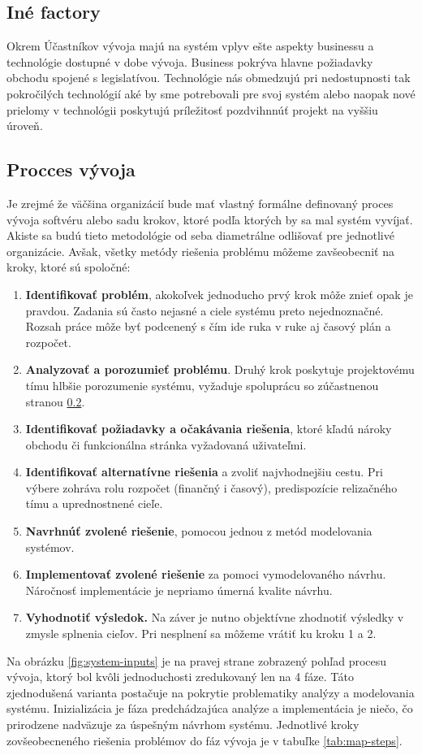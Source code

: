 \subsection{Iné factory}
Okrem Účastníkov vývoja majú na systém vplyv ešte aspekty businessu a technológie dostupné v dobe vývoja. Business pokrýva hlavne požiadavky obchodu spojené s legislatívou. Technológie nás obmedzujú pri nedostupnosti tak pokročilých technológií aké by sme potrebovali pre svoj systém alebo naopak nové prielomy v technológii poskytujú príležitosť pozdvihnnúť projekt na vyššiu úroveň.

\subsection{Procces vývoja}

Je zrejmé že väčšina organizácií bude mať vlastný formálne definovaný proces vývoja softvéru alebo sadu krokov, ktoré podľa ktorých by sa mal systém vyvíjať. Akiste sa budú tieto metodológie od seba diametrálne odlišovať pre jednotlivé organizácie. Avšak, všetky metódy riešenia problému môžeme zavšeobecniť na kroky, ktoré sú spoločné: \\

\begin{enumerate}
	\item \textbf{Identifikovať problém}, akokoľvek jednoducho prvý krok môže znieť opak je pravdou. Zadania sú často nejasné a ciele systému preto nejednoznačné. Rozsah práce môže byť podcenený s čím ide ruka v ruke aj časový plán a rozpočet.
	\item \textbf{Analyzovať a porozumieť problému}. Druhý krok poskytuje projektovému tímu hlbšie porozumenie systému, vyžaduje spoluprácu so zúčastnenou stranou \ref{}.
	\item \textbf{Identifikovať požiadavky a očakávania riešenia}, ktoré kľadú nároky obchodu či funkcionálna stránka vyžadovaná uživateľmi.
	\item \textbf{Identifikovať alternatívne riešenia} a zvoliť najvhodnejšiu cestu. Pri výbere zohráva rolu rozpočet (finančný i časový), predispozície relizačného tímu a uprednostnené cieľe.
	\item \textbf{Navrhnúť zvolené riešenie}, pomocou jednou z metód modelovania systémov.
	\item \textbf{Implementovať zvolené riešenie} za pomoci vymodelovaného návrhu. Náročnosť implementácie je nepriamo úmerná kvalite návrhu.
	\item \textbf{Vyhodnotiť výsledok.} Na záver je nutno objektívne zhodnotiť výsledky v zmysle splnenia cieľov. Pri nesplnení sa môžeme vrátiť ku kroku 1 a 2.
\end{enumerate}
\vspace{1cm}
Na obrázku \ref{fig:system-inputs} je na pravej strane zobrazený pohľad procesu vývoja, ktorý bol kvôli jednoduchosti zredukovaný len na 4 fáze. Táto zjednodušená varianta postačuje na pokrytie problematiky analýzy a modelovania systému. Inizializácia je fáza predchádzajúca analýze a implementácia je niečo, čo prirodzene nadväzuje za úspešným návrhom systému. Jednotlivé kroky zovšeobecneného riešenia problémov do fáz vývoja je v tabuľke \ref{tab:map-steps}. \\

